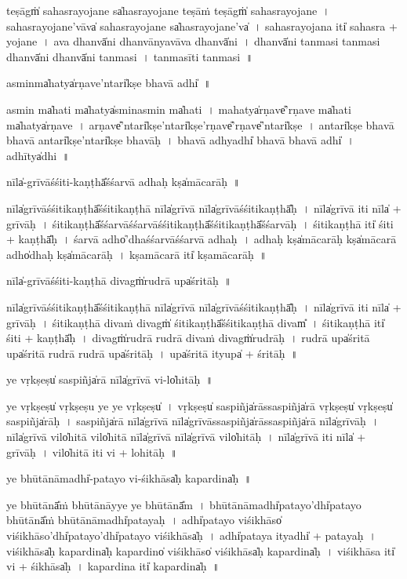 \documentclass[parskip, DIV=14]{scrartcl}
\begin{document}
{teṣāgṁ̍ sahasrayoja॒ne  sa̍hasrayoja॒ne teṣā॒ṁ teṣāgṁ̍ sahasrayoja॒ne~।
sa॒ha॒sra॒yo॒ja॒ne'vāva̍ sahasrayoja॒ne sa̍hasrayoja॒ne'va̍~।
sa॒ha॒sra॒yo॒ja॒na iti̍ sahasra + yo॒ja॒ne~।
ava॒ dhanvā̍ni॒ dhanvā॒nyavāva॒ dhanvā̍ni~।
dhanvā̍ni tanmasi tanmasi॒ dhanvā̍ni॒ dhanvā̍ni tanmasi~।
ta॒nmasīti tanmasi~॥ 

a॒sminma̍ha॒tya̍rṇa॒ve'ntari̍kṣe bha॒vā adhi̍~॥

a॒smin ma̍ha॒ti ma̍ha॒tya̍smina॒smin ma̍ha॒ti~।
ma॒hatya̍rṇa॒ve̎'rṇa॒ve ma̍ha॒ti ma̍ha॒tya̍rṇa॒ve~।
a॒rṇa॒ve̎'ntari̍kṣe॒'ntari̍kṣe'rṇa॒ve̎'rṇa॒ve̎'ntari̍kṣe~।
a॒ntari̍kṣe bha॒vā bha॒vā antari̍kṣe॒'ntari̍kṣe bha॒vāḥ~।
bha॒vā adhyadhi̍ bha॒vā bha॒vā adhi̍~।
adhītya̍dhi~॥


nīla̍-grīvāśśiti॒-kaṇṭhā̎śśa॒rvā a॒dhaḥ kṣa̍māca॒rāḥ~॥

nīla̍grīvāśśiti॒kaṇṭhā̎śśiti॒kaṇṭhā॒ nīla̍grīvā॒ nīla̍grīvāśśiti॒kaṇṭhā̎ḥ~।
nīla̍grīvā॒ iti॒ nīla̍ + grī॒vā॒ḥ॒~।
śi॒ti॒kaṇṭhā̎śśa॒rvāśśa॒rvāśśiti॒kaṇṭhā̎śśiti॒kaṇṭhā̎śśa॒rvāḥ~।
śi॒ti॒kaṇṭhā॒ iti̍ śiti + kaṇṭhā̎ḥ~।
śa॒rvā a॒dho̍'dhaśśa॒rvāśśa॒rvā a॒dhaḥ~।
a॒dhaḥ kṣa̍māca॒rāḥ kṣa̍māca॒rā a॒dho̍dhaḥ kṣa̍māca॒rāḥ~।
kṣa॒mā॒ca॒rā iti̍ kṣamāca॒rāḥ~॥

nīla̍-grīvāśśiti॒-kaṇṭhā॒ divagṁ̍ru॒drā upa̍śritāḥ~॥

nīla̍grīvāśśiti॒kaṇṭhā̎śśiti॒kaṇṭhā॒ nīla̍grīvā॒ nīla̍grīvāśśiti॒kaṇṭhā̎ḥ~।
nīla̍grīvā॒ iti॒ nīla̍ + grī॒vā॒ḥ॒~।
śi॒ti॒kaṇṭhā॒ diva॒ṁ divagṁ̍ śiti॒kaṇṭhā̎śśiti॒kaṇṭhā॒ divam̎~।
śi॒ti॒kaṇṭhā॒ iti̍ śiti + kaṇṭhā̎ḥ~।
divagṁ̍ru॒drā ru॒drā diva॒ṁ divagṁ̍ru॒drāḥ~।
ru॒drā upa̍śritā॒ upa̍śritā ru॒drā ru॒drā upa̍śritāḥ~।
upa̍śritā॒ ityupa̍ + śri॒tā॒ḥ॒~॥

ye vṛ॒kṣeṣu̍ sa॒spiñja̍rā॒ nīla̍grīvā॒ vi-lo̍hitāḥ~॥

ye vṛ॒kṣeṣu̍ vṛ॒kṣeṣu॒ ye ye vṛ॒kṣeṣu̍~।
vṛ॒kṣeṣu̍ sa॒spiñja̍rāssa॒spiñja̍rā vṛ॒kṣeṣu̍ vṛ॒kṣeṣu̍ sa॒spiñja̍rāḥ~।
sa॒spiñja̍rā॒ nīla̍grīvā॒ nīla̍grīvāssa॒spiñja̍rāssa॒spiñja̍rā॒ nīla̍grīvāḥ~।
nīla̍grīvā॒ vilo̍hitā॒ vilo̍hitā॒ nīla̍grīvā॒ nīla̍grīvā॒ vilo̍hitāḥ~।
nīla̍grīvā॒ iti॒ nīla̍ + grī॒vā॒ḥ॒~।
vilo̍hitā॒ iti॒ vi + lo॒hi॒tā॒ḥ॒~॥

ye bhū॒tānā॒madhi̍-patayo vi-śi॒khāsa̍ḥ kapa॒rdina̍ḥ~॥

ye bhū॒tānā̎ṁ bhū॒tānā॒yye ye bhū॒tānā̎m~।
bhū॒tānā॒madhi̍pata॒yo'dhi̍patayo bhū॒tānā̎ṁ bhū॒tānā॒madhi̍patayaḥ~।
adhi̍patayo viśi॒khāso̍ viśi॒khāso'dhi̍patayo'dhi̍patayo viśi॒khāsa̍ḥ~।
adhi̍pataya॒ ityadhi̍ + pa॒ta॒ya॒ḥ॒~।
vi॒śi॒khāsa̍ḥ kapa॒rdina̍ḥ kapa॒rdino̍ viśi॒khāso̍ viśi॒khāsa̍ḥ kapa॒rdina̍ḥ~।
vi॒śi॒khāsa॒ iti̍ vi + śi॒khāsa̍ḥ~।
ka॒pa॒rdina॒ iti̍ kapa॒rdina̍ḥ~॥

}
\end{document}
